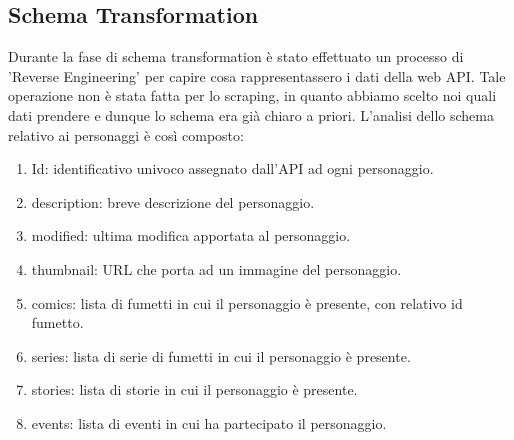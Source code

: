 \documentclass[
12pt, %
a4paper, %
oneside, %
headinclude,footinclude, %
BCOR5mm, %
]{scrartcl}
\begin{document}
\subsection{Schema Transformation}
Durante la fase di schema transformation è stato effettuato un processo di 'Reverse Engineering' per capire cosa rappresentassero i dati della web API. Tale operazione non è stata fatta per lo scraping, in quanto abbiamo scelto noi quali dati prendere e dunque lo schema era già chiaro a priori.
L'analisi dello schema relativo ai personaggi è così composto:

\begin{enumerate}
	\item Id: identificativo univoco assegnato dall'API ad ogni personaggio.
	\item description: breve descrizione del personaggio.
	\item modified: ultima modifica apportata al personaggio.
	\item thumbnail: URL che porta ad un immagine del personaggio.
	\item comics: lista di fumetti in cui il personaggio è presente, con relativo id fumetto.
	\item series: lista di serie di fumetti in cui il personaggio è presente.
	\item stories: lista di storie in cui il personaggio è presente.
	\item events: lista di eventi in cui ha partecipato il personaggio.
\end{enumerate}
\end{document}
